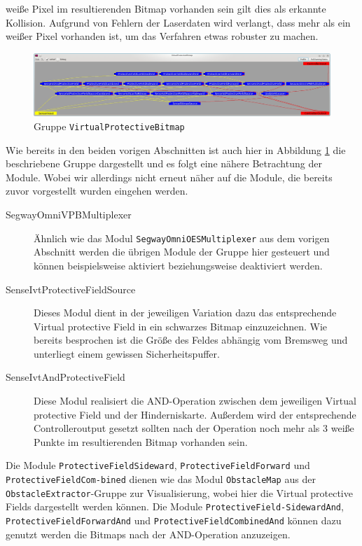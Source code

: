  weiße Pixel im resultierenden Bitmap vorhanden sein gilt dies als erkannte Kollision. Aufgrund von Fehlern der Laserdaten wird verlangt, dass mehr als ein
 weißer Pixel vorhanden ist, um das Verfahren etwas robuster zu machen.
\begin{figure}[h]
\center
\includegraphics[scale=0.29]{graphics/VirtualProtectiveBitmap.jpg}
\caption{\label{fig:virtualprotectivebitmap} Gruppe \lstinline{VirtualProtectiveBitmap}}
\end{figure}
 Wie bereits in den beiden vorigen Abschnitten  ist auch hier in Abbildung
 \ref{fig:virtualprotectivebitmap} die beschriebene Gruppe dargestellt und es
 folgt eine nähere Betrachtung der Module.
 Wobei wir allerdings nicht erneut näher auf die Module, die bereits zuvor
 vorgestellt wurden eingehen werden.

\begin{description}
\item[SegwayOmniVPBMultiplexer] Ähnlich wie das Modul
\lstinline{SegwayOmniOESMultiplexer} aus dem vorigen Abschnitt werden die
 übrigen Module der Gruppe hier gesteuert und können beispielsweise aktiviert
 beziehungsweise deaktiviert werden.
\item[SenseIvtProtectiveFieldSource] Dieses Modul dient in der jeweiligen
Variation dazu das entsprechende Virtual protective Field in ein schwarzes
Bitmap einzuzeichnen. Wie bereits besprochen ist die Größe des Feldes abhängig
vom Bremsweg und unterliegt einem gewissen Sicherheitspuffer.
\item[SenseIvtAndProtectiveField]  Diese Modul realisiert die AND-Operation zwischen dem jeweiligen
 Virtual protective Field und der Hinderniskarte. Außerdem wird der entsprechende Controlleroutput gesetzt
 sollten nach der Operation noch mehr als 3 weiße Punkte im resultierenden Bitmap vorhanden sein.
\end{description}

Die Module \lstinline{ProtectiveFieldSideward},
 \lstinline{ProtectiveFieldForward} und
 \lstinline{ProtectiveFieldCom-}\lstinline{bined} dienen wie das Modul
 \lstinline{ObstacleMap} aus der \lstinline{ObstacleExtractor}-Gruppe zur Visualisierung, wobei hier die Virtual
 protective Fields dargestellt werden können. Die Module 
 \lstinline{ProtectiveField-}\lstinline{SidewardAnd},
 \lstinline{ProtectiveFieldForwardAnd} und \lstinline{ProtectiveFieldCombinedAnd} können dazu genutzt werden die
 Bitmaps nach der AND-Operation anzuzeigen.
